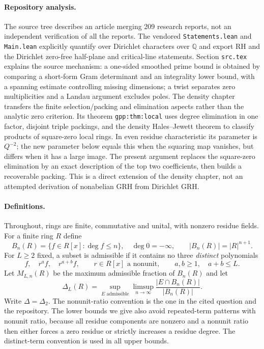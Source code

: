 \documentclass[11pt]{article}
\theoremstyle{remark}\newtheorem{remark}[theorem]{Remark}
\begin{document}
\paragraph{Repository analysis.} The source tree describes an article merging 209 research reports, not an independent verification of all the reports. The vendored \texttt{Statements.lean} and \texttt{Main.lean} explicitly quantify over Dirichlet characters over $\mathbb Q$ and export RH and the Dirichlet zero-free half-plane and critical-line statements. Section \texttt{src.tex} explains the source mechanism: a one-sided smoothed prime bound is obtained by comparing a short-form Gram determinant and an integrality lower bound, with a spanning estimate controlling missing dimensions; a twist separates zero multiplicities and a Landau argument excludes poles. The density chapter transfers the finite selection/packing and elimination aspects rather than the analytic zero criterion. Its theorem \texttt{gpp:thm:local} uses degree elimination in one factor, disjoint triple packings, and the density Hales--Jewett theorem to classify products of square-zero local rings. In even residue characteristic its parameter is $Q^{-2}$; the new parameter below equals this when the squaring map vanishes, but differs when it has a large image. The present argument replaces the square-zero elimination by an exact description of the top two coefficients, then builds a recoverable packing. This is a direct extension of the density chapter, not an attempted derivation of nonabelian GRH from Dirichlet GRH.

\paragraph{Definitions.} Throughout, rings are finite, commutative and unital, with nonzero residue fields. For a finite ring $R$ define
\[
 B_n(R)=\{f\in R[x]:\deg f\le n\},\quad \deg 0=-\infty,
 \qquad |B_n(R)|=|R|^{n+1}.
\]
For $L\ge2$ fixed, a subset is admissible if it contains no three \emph{distinct} polynomials
\begin{equation}\label{eq:pattern}
 f,\quad r^af,\quad r^{a+b}f,\qquad
 r\in R[x]\text{ a nonunit},\qquad a,b\ge1,\quad a+b\le L.
\end{equation}
Let $M_{L,n}(R)$ be the maximum admissible fraction of $B_n(R)$ and let
\[
 \Delta_L(R)=\sup_{E\text{ admissible}}\limsup_{n\to\infty}
 \frac{|E\cap B_n(R)|}{|B_n(R)|}.
\]
Write $\Delta=\Delta_2$. The nonunit-ratio convention is the one in the cited question and the repository. The lower bounds we give also avoid repeated-term patterns with nonunit ratio, because all residue components are nonzero and a nonunit ratio then either forces a zero residue or strictly increases a residue degree. The distinct-term convention is used in all upper bounds.
\end{document}
